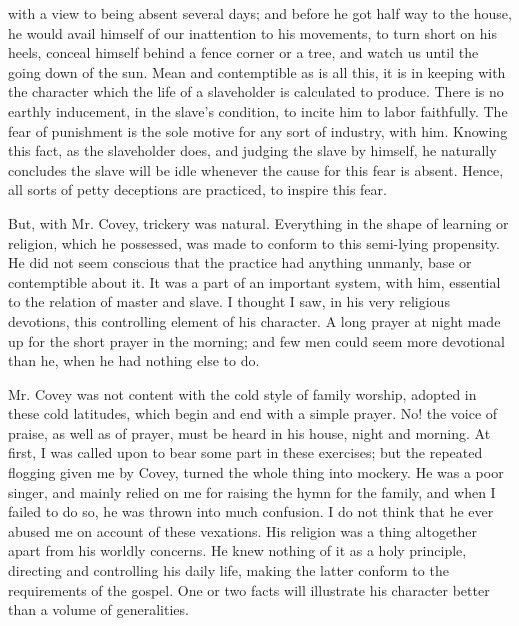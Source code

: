 with a view to being absent several days; and before he got half way to
the house, he would avail himself of our inattention to his movements,
to turn short on his heels, conceal himself behind a fence corner or a
tree, and watch us until the going down of the sun. Mean and
contemptible as is all this, it is in keeping with the character which
the life of a slaveholder is calculated to produce. There is no earthly
inducement, in the slave's condition, to incite him to labor faithfully.
The fear of punishment is the sole motive for any sort of industry, with
him. Knowing this fact, as the slaveholder does, and judging the slave
by himself, he naturally concludes the slave will be idle whenever the
cause for this fear is absent. Hence, all sorts of petty deceptions are
practiced, to inspire this fear.

But, with Mr. Covey, trickery was natural. Everything in the shape of
learning or religion, which {}he possessed, was made to conform to this
semi-lying propensity. He did not seem conscious that the practice had
anything unmanly, base or contemptible about it. It was a part of an
important system, with him, essential to the relation of master and
slave. I thought I saw, in his very religious devotions, this
controlling element of his character. A long prayer at night made up for
the short prayer in the morning; and few men could seem more devotional
than he, when he had nothing else to do.

Mr. Covey was not content with the cold style of family worship, adopted
in these cold latitudes, which begin and end with a simple prayer. No!
the voice of praise, as well as of prayer, must be heard in his house,
night and morning. At first, I was called upon to bear some part in
these exercises; but the repeated flogging given me by Covey, turned the
whole thing into mockery. He was a poor singer, and mainly relied on me
for raising the hymn for the family, and when I failed to do so, he was
thrown into much confusion. I do not think that he ever abused me on
account of these vexations. His religion was a thing altogether apart
from his worldly concerns. He knew nothing of it as a holy principle,
directing and controlling his daily life, making the latter conform to
the requirements of the gospel. One or two facts will illustrate his
character better than a volume of generalities.

